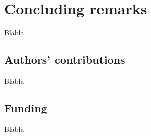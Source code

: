 \documentclass[oneside,twocolumn]{article}
\begin{document}
\section*{Concluding remarks}
Blabla

\subsection*{Authors' contributions}
Blabla

\subsection*{Funding}
Blabla







\end{document}
